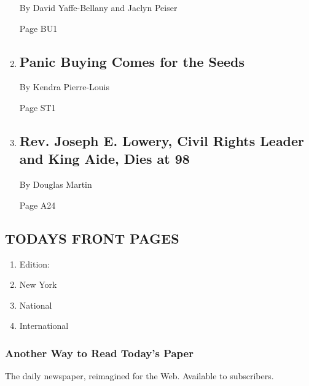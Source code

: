 \begin{enumerate}
  By David Yaffe-Bellany and Jaclyn Peiser

  Page BU1
\item
  \href{/2020/03/28/style/seed-panic-buying-coronavirus.html}{}

  \hypertarget{panic-buying-comes-for-the-seeds}{%
  \subsection{Panic Buying Comes for the
  Seeds}\label{panic-buying-comes-for-the-seeds}}

  By Kendra Pierre-Louis

  Page ST1
\item
  \href{/2020/03/28/us/joseph-lowery-dead.html}{}

  \hypertarget{rev-joseph-e-lowery-civil-rights-leader-and-king-aide-dies-at-98}{%
  \subsection{Rev. Joseph E. Lowery, Civil Rights Leader and King Aide,
  Dies at
  98}\label{rev-joseph-e-lowery-civil-rights-leader-and-king-aide-dies-at-98}}

  By Douglas Martin

  Page A24
\end{enumerate}

\hypertarget{todays-front-pages}{%
\subsection{TODAYS FRONT PAGES}\label{todays-front-pages}}

\begin{enumerate}
\def\labelenumi{\arabic{enumi}.}
\tightlist
\item
  Edition:
\item
  New York
\item
  National
\item
  International
\end{enumerate}

\href{http://app.nytimes3xbfgragh.onion/todayspaper}{}

\hypertarget{another-way-to-read-todays-paper}{%
\subsubsection{Another Way to Read Today's
Paper}\label{another-way-to-read-todays-paper}}

The daily newspaper, reimagined for the Web. Available to subscribers.

